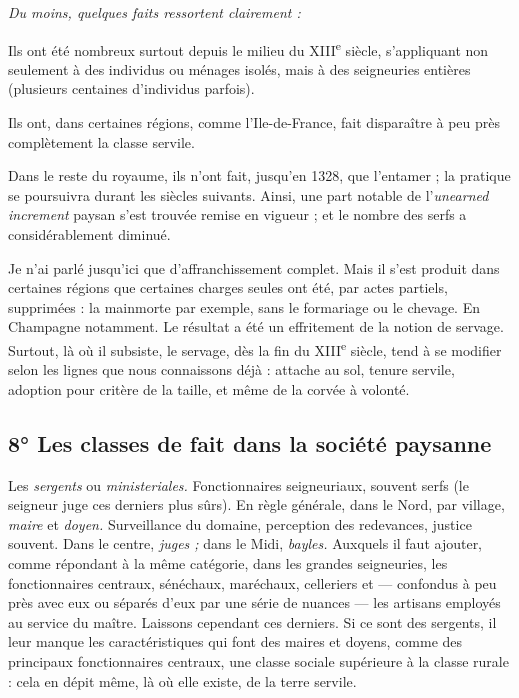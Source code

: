 \documentclass[french,twoside]{book} %
\newlength{\listmod}
\newcommand{\listhead}[1]{\hspace{-1\listmod}\emph{#1}}
\newcommand{\labelchar}[1]{{\color{rubric}\bf #1}}
\begin{document}
\begin{listalpha}[itemsep=0pt,]
\item[]\listhead{Du moins, quelques faits ressortent clairement :}
\item Ils ont été nombreux surtout depuis le milieu du XIII\textsuperscript{e} siècle, s’appliquant non seulement à des individus ou ménages isolés, mais à des seigneuries entières (plusieurs centaines d’individus parfois).
\item Ils ont, dans certaines régions, comme l’Ile-de-France, fait disparaître à peu près complètement la classe servile.
\item Dans le reste du royaume, ils n’ont fait, jusqu’en 1328, que l’entamer ; la pratique se poursuivra durant les siècles suivants. Ainsi, une part notable de l’{\itshape unearned increment} paysan s’est trouvée remise en vigueur ; et le nombre des serfs a considérablement diminué.

\end{listalpha}\noindent Je n’ai parlé jusqu’ici que d’affranchissement complet. Mais il s’est produit dans certaines régions que certaines charges seules ont été, par actes partiels, supprimées : la mainmorte par exemple, sans le formariage ou le chevage. En Champagne notamment. Le résultat a été un effritement de la notion de servage. Surtout, là où il subsiste, le servage, dès la fin du XIII\textsuperscript{e} siècle, tend à se modifier selon les lignes que nous connaissons déjà : attache au sol, tenure servile, adoption pour critère de la taille, et même de la corvée à volonté.
\subsection[8° Les classes de fait dans la société paysanne]{8° Les classes de fait dans la société paysanne}
\noindent \labelchar{a)} Les {\itshape sergents} ou {\itshape ministeriales.} Fonctionnaires seigneuriaux, souvent serfs (le seigneur juge ces derniers plus sûrs). En règle générale, dans le Nord, par village, {\itshape maire} et {\itshape doyen.} Surveillance du domaine, perception des redevances, justice souvent. Dans le centre, {\itshape juges ;} dans le Midi, {\itshape bayles.} Auxquels il faut ajouter, comme répondant à la même catégorie, dans les grandes seigneuries, les fonctionnaires centraux, sénéchaux, maréchaux, celleriers et — confondus à peu près avec eux ou séparés d’eux par une série de nuances — les artisans employés au service du maître. Laissons cependant ces derniers. Si ce sont des sergents, il leur manque les caractéristiques qui font des maires et doyens, comme des principaux fonctionnaires centraux, une classe sociale supérieure à la classe rurale : cela en dépit même, là où elle existe, de la terre servile.\par
\end{document}
